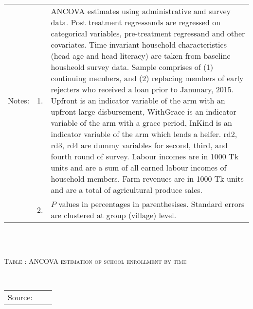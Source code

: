 \begin{minipage}[t]{14cm}
\begin{tabular}{>{\hfill\scriptsize}p{1cm}<{}>{\hfill\scriptsize}p{.25cm}<{}>{\scriptsize}p{12cm}<{\hfill}}
Notes: & 1. & ANCOVA estimates using administrative and survey data. Post treatment regressands are regressed on categorical variables, pre-treatment regressand and other covariates. Time invariant household characteristics (head age and head literacy) are taken from baseline housheold survey data. Sample comprises of (1) continuing members, and (2) replacing members of early rejecters who received a loan prior to Janunary, 2015.  \textsf{Upfront} is an indicator variable of the arm with an upfront large disbursement, \textsf{WithGrace} is an indicator variable of the arm with a grace period, \textsf{InKind} is an indicator variable of the arm which lends a heifer. \textsf{rd2, rd3, rd4} are dummy variables for second, third, and fourth round of survey. Labour incomes are in 1000 Tk units and are a sum of all earned labour incomes of household members. Farm revenues are in 1000 Tk units and are a total of agricultural produce sales. \\
& 2. & $P$ values in percentages in parenthesises. Standard errors are clustered at group (village) level. %
 \end{tabular}
\end{minipage} \\\\\hspace{-1cm}\begin{minipage}[t]{14cm} \hfil\textsc{\normalsize Table \thetable: ANCOVA estimation of school enrollment by time\label{tab ANCOVA enroll time varying1}}\\ \setlength{\tabcolsep}{1pt}
  \setlength{\baselineskip}{8pt}
  \renewcommand{\arraystretch}{.55}
  \hfil{}\\
\renewcommand{\arraystretch}{.8}
\setlength{\tabcolsep}{1pt} \begin{tabular}{>{\hfill\scriptsize}p{1cm}<{}>{\hfill\scriptsize}p{.25cm}<{}>{\scriptsize}p{12cm}<{\hfill}} 
Source:& \multicolumn{2}{l}{\scriptsize Estimated with GUK administrative and survey data.}\\

\end{tabular}
\end{minipage}
